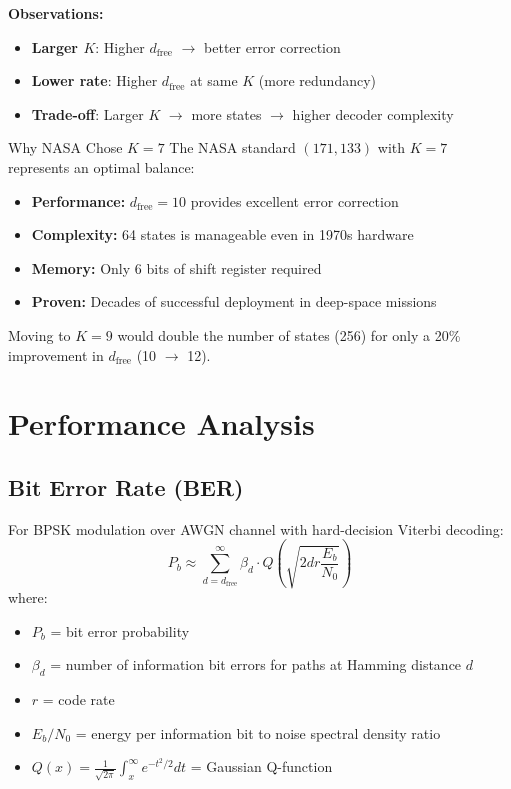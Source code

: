 \textbf{Observations:}
\begin{itemize}
\item \textbf{Larger $K$}: Higher $d_{\text{free}}$ $\rightarrow$ better error correction
\item \textbf{Lower rate}: Higher $d_{\text{free}}$ at same $K$ (more redundancy)
\item \textbf{Trade-off}: Larger $K$ $\rightarrow$ more states $\rightarrow$ higher decoder complexity
\end{itemize}

\begin{calloutbox}{Why NASA Chose $K=7$}
The NASA standard $(171, 133)$ with $K=7$ represents an optimal balance:
\begin{itemize}
\item \textbf{Performance:} $d_{\text{free}} = 10$ provides excellent error correction
\item \textbf{Complexity:} 64 states is manageable even in 1970s hardware
\item \textbf{Memory:} Only 6 bits of shift register required
\item \textbf{Proven:} Decades of successful deployment in deep-space missions
\end{itemize}

Moving to $K=9$ would double the number of states (256) for only a 20\% improvement in $d_{\text{free}}$ (10 $\to$ 12).
\end{calloutbox}

\section{Performance Analysis}

\subsection{Bit Error Rate (BER)}

For BPSK modulation over AWGN channel with hard-decision Viterbi decoding:
\begin{equation}
P_b \approx \sum_{d=d_{\text{free}}}^{\infty} \beta_d \cdot Q\left(\sqrt{2 d r \frac{E_b}{N_0}}\right)
\label{eq:ber-convolutional}
\end{equation}
where:
\begin{itemize}
\item $P_b$ = bit error probability
\item $\beta_d$ = number of information bit errors for paths at Hamming distance $d$
\item $r$ = code rate
\item $E_b/N_0$ = energy per information bit to noise spectral density ratio
\item $Q(x) = \frac{1}{\sqrt{2\pi}} \int_x^\infty e^{-t^2/2} dt$ = Gaussian Q-function
\end{itemize}


